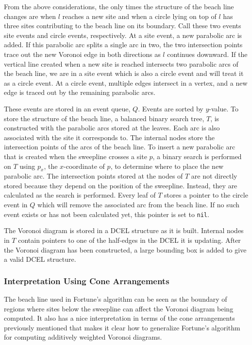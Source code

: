 \documentclass[a4paper, 11pt]{article}
\begin{document}
From the above considerations, the only times the structure of the beach line changes are when $l$ reaches a new site and when a circle lying on top
of $l$ has three sites contributing to the beach line on its boundary. Call these two events site events and circle events, respectively. At a site
event, a new parabolic arc is added. If this parabolic arc splits a single arc in two, the two intersection points trace out the new Voronoi edge in
both directions as $l$ continues downward. If the vertical line created when a new site is reached intersects two parabolic arcs of the beach line, we
are in a site event which is also a circle event and will treat it as a circle event. At a circle event, multiple edges intersect in a vertex, and a
new edge is traced out by the remaining parabolic arcs.

These events are stored in an event queue, $Q$. Events are sorted by $y$-value. To store the structure of the beach line, a balanced binary search
tree, $T$, is constructed with the parabolic arcs stored at the leaves. Each arc is also associated with the
site it corresponds to. The internal nodes store the intersection points of the arcs of the beach line. To insert a new parabolic arc that is created
when the sweepline crosses a site $p$, a binary search is performed on $T$ using $p_x$, the $x$-coordinate of $p$, to determine where to place the new
parabolic arc. The intersection points stored at the nodes of $T$ are not directly stored because they depend on the position of the sweepline.
Instead, they are calculated as the search is performed. Every leaf of $T$ stores a pointer to the circle event in $Q$ which will remove the
associated arc from the beach line. If no such event exists or has not been calculated yet, this pointer is set to \texttt{nil}.

The Voronoi diagram is stored in a DCEL structure as it is built. Internal nodes in $T$ contain pointers to one of the half-edges in the DCEL it is
updating. After the Voronoi diagram has been constructed, a large bounding box is added to give a valid DCEL structure.

\subsubsection{Interpretation Using Cone Arrangements}

The beach line used in Fortune's algorithm can be seen as the boundary of regions where sites below the sweepline can affect the Voronoi diagram being
computed. It also has a nice interpretation in terms of the cone arrangements previously mentioned that makes it clear how to generalize Fortune's
algorithm for computing additively weighted Voronoi diagrams.
\end{document}
